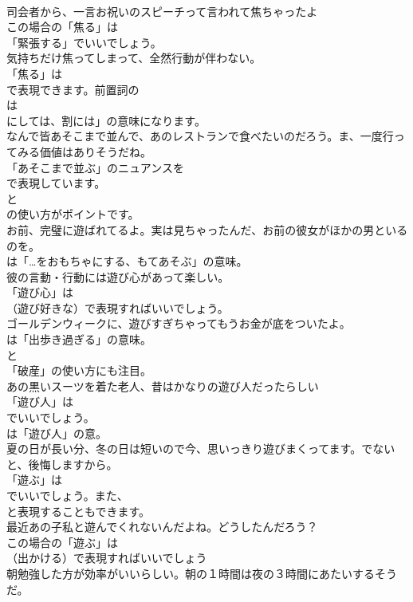 \documentclass[8pt]{extreport}
\begin{document}
\begin{CJK}{UTF8}{min}
\\	司会者から、一言お祝いのスピーチって言われて焦ちゃったよ 
\\	この場合の「焦る」は
\\	「緊張する」でいいでしょう。	
\\	気持ちだけ焦ってしまって、全然行動が伴わない。 
\\	「焦る」は
\\	で表現できます。前置詞の
\\	は
\\	にしては、割には」の意味になります。	
\\	なんで皆あそこまで並んで、あのレストランで食べたいのだろう。ま、一度行ってみる価値はありそうだね。 
\\	「あそこまで並ぶ」のニュアンスを 
\\	で表現しています。
\\	と 
\\	の使い方がポイントです。	
\\	お前、完璧に遊ばれてるよ。実は見ちゃったんだ、お前の彼女がほかの男といるのを。 
\\	は「…をおもちゃにする、もてあそぶ」の意味。	
\\	彼の言動・行動には遊び心があって楽しい。 
\\	「遊び心」は 
\\	（遊び好きな）で表現すればいいでしょう。	
\\	ゴールデンウィークに、遊びすぎちゃってもうお金が底をついたよ。 
\\	は「出歩き過ぎる」の意味。
\\	と
\\	「破産」の使い方にも注目。	
\\	あの黒いスーツを着た老人、昔はかなりの遊び人だったらしい 
\\	「遊び人」は 
\\	でいいでしょう。
\\	は「遊び人」の意。	
\\	夏の日が長い分、冬の日は短いので今、思いっきり遊びまくってます。でないと、後悔しますから。 
\\	「遊ぶ」は 
\\	でいいでしょう。また、
\\	と表現することもできます。	
\\	最近あの子私と遊んでくれないんだよね。どうしたんだろう？ 
\\	この場合の「遊ぶ」は 
\\	（出かける）で表現すればいいでしょう	
\\	朝勉強した方が効率がいいらしい。朝の１時間は夜の３時間にあたいするそうだ。 

\end{CJK}
\end{document}
